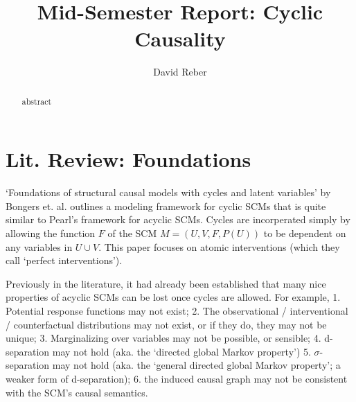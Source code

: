 \documentclass[letterpaper,10pt]{article}
\begin{document}
\title{Mid-Semester Report: Cyclic Causality}

\author{David Reber}
\address{Columbia University}


\begin{abstract}
abstract
\end{abstract}


\section{Lit. Review: Foundations \cite{Foundations}}

`Foundations of structural causal models with cycles and latent variables' by Bongers et. al. \cite{Foundations} outlines a modeling framework for cyclic SCMs that is quite similar to Pearl's framework for acyclic SCMs.
Cycles are incorperated simply by allowing the function $F$ of the SCM $M=(U,V,F,P(U))$ to be dependent on any variables in $U\cup V$.
This paper focuses on atomic interventions (which they call `perfect interventions').

Previously in the literature, it had already been established that many nice properties of acyclic SCMs can be lost once cycles are allowed. For example, 1. Potential response functions may not exist; 2. The observational / interventional / counterfactual distributions may not exist, or if they do, they may not be unique; 3. Marginalizing over variables may not be possible, or sensible; 4. d-separation may not hold (aka. the `directed global Markov property') 5. $\sigma$-separation may not hold (aka. the `general directed global Markov property'; a weaker form of d-separation); 6. the induced causal graph may not be consistent with the SCM's causal semantics. 
\end{document}
